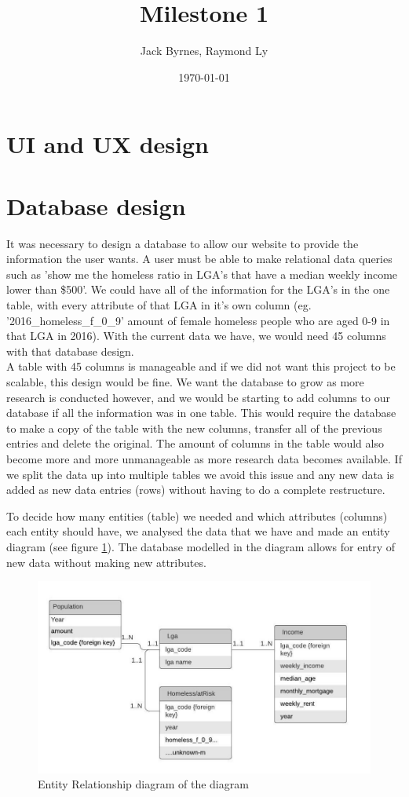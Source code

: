 \documentclass[12pt, a4paper]{article}
\title{Milestone 1}
\author{Jack Byrnes, Raymond Ly}
\date{\today}
\begin{document}
\maketitle
\tableofcontents

\section{UI and UX design}


\section{Database design}
It was necessary to design a database to allow our website to provide the information the user wants. A user must be able to make relational data queries such as 'show me the homeless ratio in LGA's that have a median weekly income lower than \$500'. We could have all of the information for the LGA's in the one table, with every attribute of that LGA in it's own column (eg. '2016\_homeless\_f\_0\_9' amount of female homeless people who are aged 0-9 in that LGA in 2016). With the current data we have, we would need 45 columns with that database design. \\

A table with 45 columns is manageable and if we did not want this project to be scalable, this design would be fine. We want the database to grow as more research is conducted however, and we would be starting to add columns to our database if all the information was in one table. This would require the database to make a copy of the table with the new columns, transfer all of the previous entries and delete the original. The amount of columns in the table would also become more and more unmanageable as more research data becomes available. If we split the data up into multiple tables we avoid this issue and any new data is added as new data entries (rows) without having to do a complete restructure.

To decide how many entities (table) we needed and which attributes (columns) each entity should have, we analysed the data that we have and made an entity diagram (see figure \ref{fig:erdiagram}). The database modelled in the diagram allows for entry of new data without making new attributes. 

\begin{figure}[h]
\centering
\includegraphics[scale=.8]{ERDiagram.jpg} 
\caption{Entity Relationship diagram of the diagram}
\label{fig:erdiagram}
\end{figure}
\end{document}

